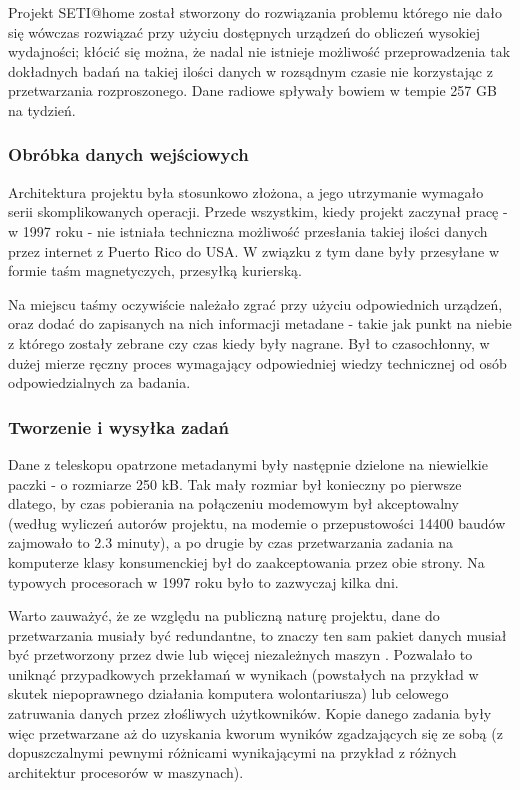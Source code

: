 \documentclass[12pt,a4paper,twoside]{article}
\begin{document}
Projekt SETI@home został stworzony do rozwiązania problemu którego nie dało się wówczas rozwiązać przy użyciu dostępnych urządzeń do obliczeń wysokiej wydajności; kłócić się można, że nadal nie istnieje możliwość przeprowadzenia tak dokładnych badań na takiej ilości danych w rozsądnym czasie nie korzystając z przetwarzania rozproszonego. Dane radiowe spływały bowiem w tempie 257 GB na tydzień.

\subsubsection{Obróbka danych wejściowych}

Architektura projektu była stosunkowo złożona, a jego utrzymanie wymagało serii skomplikowanych operacji. Przede wszystkim, kiedy projekt zaczynał pracę - w 1997 roku - nie istniała techniczna możliwość przesłania takiej ilości danych przez internet z Puerto Rico do USA. W związku z tym dane były przesyłane w formie taśm magnetyczych, przesyłką kurierską. 

Na miejscu taśmy oczywiście należało zgrać przy użyciu odpowiednich urządzeń, oraz dodać do zapisanych na nich informacji metadane - takie jak punkt na niebie z którego zostały zebrane czy czas kiedy były nagrane. Był to czasochłonny, w dużej mierze ręczny proces wymagający odpowiedniej wiedzy technicznej od osób odpowiedzialnych za badania.

\subsubsection{Tworzenie i wysyłka zadań}

Dane z teleskopu opatrzone metadanymi były następnie dzielone na niewielkie paczki - o rozmiarze 250 kB. Tak mały rozmiar był konieczny po pierwsze dlatego, by czas pobierania na połączeniu modemowym był akceptowalny (według wyliczeń autorów projektu, na modemie o przepustowości 14400 baudów zajmowało to 2.3 minuty), a po drugie by czas przetwarzania zadania na komputerze klasy konsumenckiej był do zaakceptowania przez obie strony. Na typowych procesorach w 1997 roku było to zazwyczaj kilka dni. 

Warto zauważyć, że ze względu na publiczną naturę projektu, dane do przetwarzania musiały być redundantne, to znaczy ten sam pakiet danych musiał być przetworzony przez dwie lub więcej niezależnych maszyn \cite{seti}. Pozwalało to uniknąć przypadkowych przekłamań w wynikach (powstałych na przykład w skutek niepoprawnego działania komputera wolontariusza) lub celowego zatruwania danych przez złośliwych użytkowników. Kopie danego zadania były więc przetwarzane aż do uzyskania kworum wyników zgadzających się ze sobą (z dopuszczalnymi pewnymi różnicami wynikającymi na przykład z różnych architektur procesorów w maszynach). 
\end{document}
